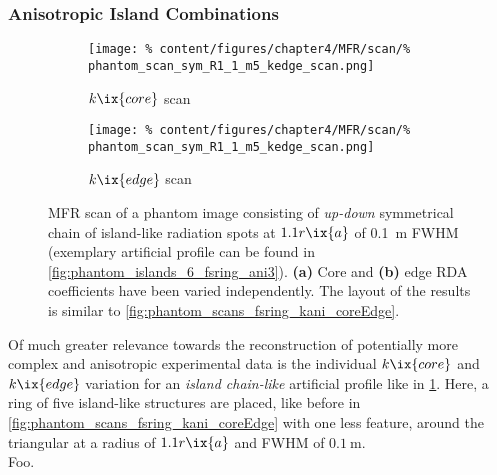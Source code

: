             \subsubsection*{Anisotropic Island Combinations}%
%
                \begin{figure}[t]%
                    \centering%
                    \begin{subfigure}{0.45\textwidth}%
                        \centering%
                        \texttt{[image: \%
                            content/figures/chapter4/MFR/scan/\%
                            phantom\_scan\_sym\_R1\_1\_m5\_kedge\_scan.png]}%
                        \caption{$k\ix{core}$ scan}%
                    \end{subfigure}%
                    \hfill%
                    \begin{subfigure}{0.45\textwidth}%
                        \centering%
                        \texttt{[image: \%
                            content/figures/chapter4/MFR/scan/\%
                            phantom\_scan\_sym\_R1\_1\_m5\_kedge\_scan.png]}%
                        \caption{$k\ix{edge}$ scan}%
                    \end{subfigure}%
                    \caption{MFR scan of a phantom image consisting of \textit{up-down} symmetrical chain of island-like radiation spots at $1.1r\ix{a}$ of \SI{0.1}{\meter} FWHM (exemplary artificial profile can be found in \cref{fig:phantom_islands_6_fsring_ani3}). \textbf{(a)} Core and \textbf{(b)} edge RDA coefficients have been varied independently. The layout of the results is similar to \cref{fig:phantom_scans_fsring_kani_coreEdge}.}\label{fig:phantom_scans_sym5_kani_coreEdge}%
                \end{figure}%
%
                Of much greater relevance towards the reconstruction of potentially more complex and anisotropic experimental data is the individual $k\ix{core}$ and $k\ix{edge}$ variation for an \textit{island chain-like} artificial profile like in \cref{fig:phantom_scans_sym5_kani_coreEdge}. Here, a ring of five island-like structures are placed, like before in \cref{fig:phantom_scans_fsring_kani_coreEdge} with one less feature, around the triangular at a radius of $1.1r\ix{a}$ and FWHM of $\SI{0.1}{\meter}$.\\%
                Foo.
%
